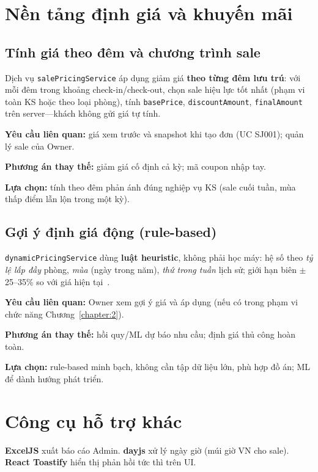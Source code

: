 \documentclass[../DoAn.tex]{subfiles}
\begin{document}
\section{Nền tảng định giá và khuyến mãi}
\label{section:3.8}

\subsection{Tính giá theo đêm và chương trình sale}

Dịch vụ \texttt{salePricingService} áp dụng giảm giá \textbf{theo từng đêm lưu trú}: với mỗi đêm trong khoảng check-in/check-out, chọn sale hiệu lực tốt nhất (phạm vi toàn KS hoặc theo loại phòng), tính \texttt{basePrice}, \texttt{discountAmount}, \texttt{finalAmount} trên server---khách không gửi giá tự tính.

\textbf{Yêu cầu liên quan:} giá xem trước và snapshot khi tạo đơn (UC SJ001); quản lý sale của Owner.

\textbf{Phương án thay thế:} giảm giá cố định cả kỳ; mã coupon nhập tay.

\textbf{Lựa chọn:} tính theo đêm phản ánh đúng nghiệp vụ KS (sale cuối tuần, mùa thấp điểm lẫn lộn trong một kỳ).

\subsection{Gợi ý định giá động (rule-based)}

\texttt{dynamicPricingService} dùng \textbf{luật heuristic}, không phải học máy: hệ số theo \textit{tỷ lệ lấp đầy} phòng, \textit{mùa} (ngày trong năm), \textit{thứ trong tuần} lịch sử; giới hạn biên $\pm$25--35\% so với giá hiện tại~\cite{talluri2004revenue}.

\textbf{Yêu cầu liên quan:} Owner xem gợi ý giá và áp dụng (nếu có trong phạm vi chức năng Chương~\ref{chapter:2}).

\textbf{Phương án thay thế:} hồi quy/ML dự báo nhu cầu; định giá thủ công hoàn toàn.

\textbf{Lựa chọn:} rule-based minh bạch, không cần tập dữ liệu lớn, phù hợp đồ án; ML để dành hướng phát triển.

\section{Công cụ hỗ trợ khác}
\label{section:3.9}

\textbf{ExcelJS} xuất báo cáo Admin. \textbf{dayjs} xử lý ngày giờ (múi giờ VN cho sale). \textbf{React Toastify} hiển thị phản hồi tức thì trên UI.
\end{document}
